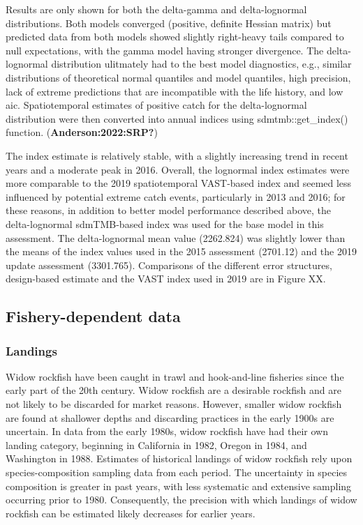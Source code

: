 \documentclass[
]{scrartcl}
\begin{document}
Results are only shown for both the delta-gamma and delta-lognormal
distributions. Both models converged (positive, definite Hessian matrix)
but predicted data from both models showed slightly right-heavy tails
compared to null expectations, with the gamma model having stronger
divergence. The delta-lognormal distribution ulitmately had to the best
model diagnostics, e.g., similar distributions of theoretical normal
quantiles and model quantiles, high precision, lack of extreme
predictions that are incompatible with the life history, and low
\gls{aic}. Spatiotemporal estimates of positive catch for the
delta-lognormal distribution were then converted into annual indices
using sdmtmb::get\_index() function. (\textbf{Anderson:2022:SRP?})

The index estimate is relatively stable, with a slightly increasing
trend in recent years and a moderate peak in 2016. Overall, the
lognormal index estimates were more comparable to the 2019
spatiotemporal VAST-based index and seemed less influenced by potential
extreme catch events, particularly in 2013 and 2016; for these reasons,
in addition to better model performance described above, the
delta-lognormal sdmTMB-based index was used for the base model in this
assessment. The delta-lognormal mean value (2262.824) was slightly lower
than the means of the index values used in the 2015 assessment (2701.12)
and the 2019 update assessment (3301.765). Comparisons of the different
error structures, design-based estimate and the VAST index used in 2019
are in Figure XX.

\subsection{Fishery-dependent data}\label{fishery-dependent-data}

\subsubsection{Landings}\label{landings}

Widow rockfish have been caught in trawl and hook-and-line fisheries
since the early part of the 20th century. Widow rockfish are a desirable
rockfish and are not likely to be discarded for market reasons. However,
smaller widow rockfish are found at shallower depths and discarding
practices in the early 1900s are uncertain. In data from the early
1980s, widow rockfish have had their own landing category, beginning in
California in 1982, Oregon in 1984, and Washington in 1988. Estimates of
historical landings of widow rockfish rely upon species-composition
sampling data from each period. The uncertainty in species composition
is greater in past years, with less systematic and extensive sampling
occurring prior to 1980. Consequently, the precision with which landings
of widow rockfish can be estimated likely decreases for earlier years.
\end{document}
